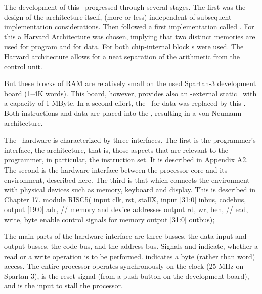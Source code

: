 The development of this \RISC\ progressed through several stages. The first was the design of the architecture itself, (more or less) independent of subsequent implementation considerations. Then followed a first implementation called . For this a Harvard Architecture was chosen, implying that two distinct memories are used for program and for data. For both chip-internal block \RAM{}s were used. The Harvard architecture allows for a neat separation of the arithmetic from the control unit.

But these blocks of RAM are relatively small on the used Spartan-3 development board (1--4K words). This board, however, provides also an \FPGA-external static \RAM\ with a capacity of 1 MByte. In a second effort, the \BRAM\ for data was replaced by this \SRAM. Both instructions and data are placed into the \SRAM, resulting in a von Neumann architecture.

The \RISC\ hardware is characterized by three interfaces. The first is the programmer's interface, the architecture, that is, those aspects that are relevant to the programmer, in particular, the instruction set. It is described in Appendix A2. The second is the hardware interface between the processor core and its environment, described here. The third is that which connects the environment with physical devices such as memory, keyboard and display. This is described in Chapter 17.
\begintt
module RISC5(
  input clk, rst, stallX,
  input [31:0] inbus, codebus,
  output [19:0] adr,            // memory and device addresses
  output rd, wr, ben,           // ead, write, byte enable control signals for memory
  output [31:0] outbus);
\endtt

The main parts of the hardware interface are three busses, the data input and output busses, the code bus, and the address bus. Signals  and  indicate, whether a read or a write operation is to be performed.  indicates a byte (rather than word) access. The entire processor operates synchronously on the clock  (25 MHz on Spartan-3),  is the reset signal (from a push button on the development board), and  is the input to stall the processor.




\bye
